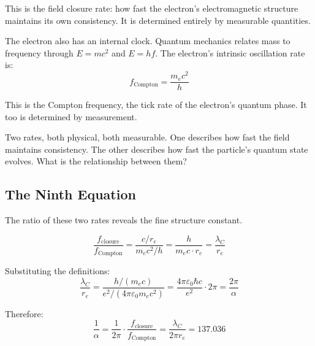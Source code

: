 \documentclass[aps,prd,preprint,superscriptaddress,showpacs,preprintnumbers,amsmath,amssymb,nofootinbib]{revtex4-2}
\begin{document}
This is the field closure rate: how fast the electron's electromagnetic structure maintains its own consistency. It is determined entirely by measurable quantities.

The electron also has an internal clock. Quantum mechanics relates mass to frequency through $E = mc^2$ and $E = hf$. The electron's intrinsic oscillation rate is:
\begin{equation}
f_{\text{Compton}} = \frac{m_e c^2}{h}
\end{equation}

This is the Compton frequency, the tick rate of the electron's quantum phase. It too is determined by measurement.

Two rates, both physical, both measurable. One describes how fast the field maintains consistency. The other describes how fast the particle's quantum state evolves. What is the relationship between them?

\subsection{The Ninth Equation}
\label{subsec:ninth}

The ratio of these two rates reveals the fine structure constant.

\begin{equation}
\frac{f_{\text{closure}}}{f_{\text{Compton}}} = \frac{c/r_e}{m_e c^2/h} = \frac{h}{m_e c \cdot r_e} = \frac{\lambda_C}{r_e}
\end{equation}

Substituting the definitions:
\begin{equation}
\frac{\lambda_C}{r_e} = \frac{h/(m_e c)}{e^2/(4\pi\varepsilon_0 m_e c^2)} = \frac{4\pi\varepsilon_0 \hbar c}{e^2} \cdot 2\pi = \frac{2\pi}{\alpha}
\end{equation}

Therefore:
\begin{equation}
\frac{1}{\alpha} = \frac{1}{2\pi} \cdot \frac{f_{\text{closure}}}{f_{\text{Compton}}} = \frac{\lambda_C}{2\pi r_e} = 137.036
\end{equation}

\vspace{0.5em}
\noindent{}
\vspace{1cm}
\end{document}
